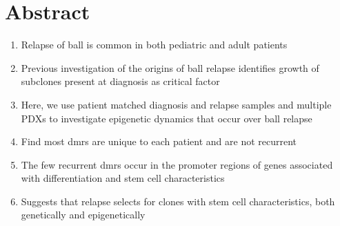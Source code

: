 \section{Abstract}

\begin{enumerate}
  \item Relapse of \gls{ball} is common in both pediatric and adult patients
  \item Previous investigation of the origins of \gls{ball} relapse identifies growth of subclones present at diagnosis as critical factor
  \item Here, we use patient matched diagnosis and relapse samples and multiple PDXs to investigate epigenetic dynamics that occur over \gls{ball} relapse
  \item Find most \glspl{dmr} are unique to each patient and are not recurrent
  \item The few recurrent \glspl{dmr} occur in the promoter regions of genes associated with differentiation and stem cell characteristics
  \item Suggests that relapse selects for clones with stem cell characteristics, both genetically and epigenetically
\end{enumerate}
